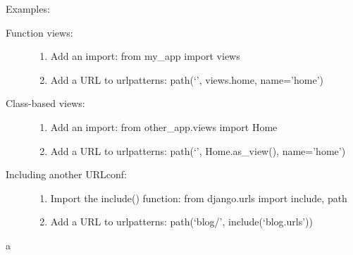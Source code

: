 \documentclass[letterpaper,10pt,openany,oneside,english]{sphinxmanual}
\begin{document}
Examples:
\begin{description}
\item[{Function views:}] \leavevmode\begin{enumerate}
\item {} 
Add an import:  from my\_app import views

\item {} 
Add a URL to urlpatterns:  path(‘’, views.home, name=’home’)

\end{enumerate}

\item[{Class-based views:}] \leavevmode\begin{enumerate}
\item {} 
Add an import:  from other\_app.views import Home

\item {} 
Add a URL to urlpatterns:  path(‘’, Home.as\_view(), name=’home’)

\end{enumerate}

\item[{Including another URLconf:}] \leavevmode\begin{enumerate}
\item {} 
Import the include() function: from django.urls import include, path

\item {} 
Add a URL to urlpatterns:  path(‘blog/’, include(‘blog.urls’))

\end{enumerate}

\end{description}


\renewcommand{\indexname}{Python Module Index}
\begin{sphinxtheindex}
\def\bigletter#1{{\Large\sffamily#1}\nopagebreak\vspace{1mm}}
\bigletter{a}
\item {}
\item {}
\item {}
\item {}
\end{sphinxtheindex}

\renewcommand{\indexname}{Index}
\printindex
\end{document}
